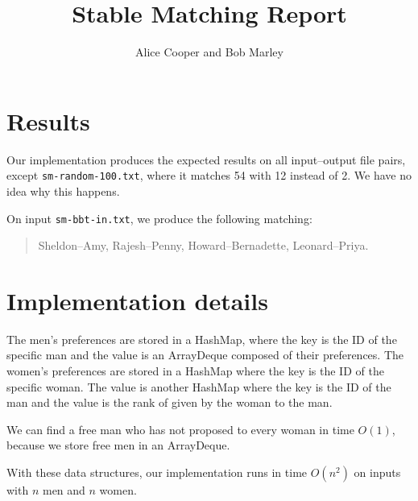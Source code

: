 \documentclass{tufte-handout}
\title{Stable Matching Report}
\author{Alice Cooper and Bob Marley}
\begin{document}
  \maketitle

  \section{Results}

  Our implementation produces the expected results on all input--output file pairs, except {\tt sm-random-100.txt}, where it matches 54 with 12 instead of 2.
  We have no idea why this happens.%

  On input {\tt sm-bbt-in.txt}, we produce the following matching:
  \begin{quotation}
    Sheldon--Amy, Rajesh--Penny, Howard--Bernadette, Leonard--Priya.  
  \end{quotation}

  \section{Implementation details}

  The men's preferences are stored in a HashMap, where the key is the ID of the specific man and the value is an ArrayDeque composed of their preferences.
  The women's preferences are stored in a HashMap where the key is the ID of the specific woman. 
  The value is another HashMap where the key is the ID of the man and the value is the rank of given by the woman to the man.

  We can find a free man who has not proposed to every woman in time $O(1)$,
  because we store free men in an ArrayDeque.

  With these data structures, our implementation runs in time $O(n^2)$ on inputs with $n$ men and $n$ women.
\end{document}
